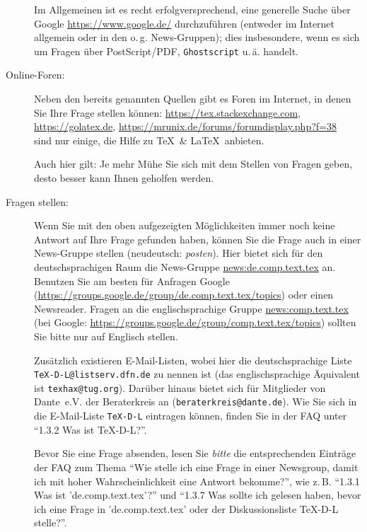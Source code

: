 \documentclass[12pt,ngerman,a4paper,fullparskip]{scrreprt}
\newcommand{\email}[1]{\texttt{#1}}
\newcommand{\cmdname}[1]{\texttt{#1}}
\newcommand{\dirname}[1]{\texttt{#1}}
\providecommand*{\PS}{Post\-Script\xspace}
\begin{document}
\begin{description}
      Im Allgemeinen ist es recht erfolgversprechend, eine generelle Suche über Google
      \url{https://www.google.de/} durchzuführen (entweder im Internet allgemein
      oder in den o.\,g. News-Gruppen); dies insbesondere, wenn es sich um Fragen über
      \PS/PDF, \cmdname{Ghostscript} u.\,ä. handelt.

\item [Online-Foren:] Neben den bereits genannten Quellen gibt es Foren im Internet, in denen Sie Ihre Frage stellen können: \url{https://tex.stackexchange.com}, \url{https://golatex.de}, \url{https://mrunix.de/forums/forumdisplay.php?f=38} \\ sind nur einige, die Hilfe zu \TeX\ \& \LaTeX\ anbieten.

Auch hier gilt: Je mehr Mühe Sie sich mit dem Stellen von Fragen geben, desto besser kann Ihnen geholfen werden.

\item [Fragen stellen:]
      Wenn Sie mit den oben aufgezeigten Möglichkeiten immer noch keine Antwort auf Ihre Frage gefunden haben, können Sie die Frage auch in einer News-Gruppe stellen (neudeutsch: \emph{posten}). Hier bietet sich für den deutschsprachigen Raum die News-Gruppe \url{news:de.comp.text.tex} an. 
      Benutzen Sie am besten für Anfragen Google 
      (\url{https://groups.google.de/group/de.comp.text.tex/topics})
      oder einen Newsreader. Fragen an die englischsprachige Gruppe
      \url{news:comp.text.tex} 
      (bei Google: \url{https://groups.google.de/group/comp.text.tex/topics}) 
      sollten Sie bitte nur auf Englisch stellen.

      Zusätzlich existieren E-Mail-Listen, wobei hier die deutschsprachige Liste
      \email{TeX-D-L@listserv.dfn.de} zu nennen ist (das englischsprachige Äquivalent 
      ist \email{texhax@tug.org}). Darüber hinaus bietet sich für Mitglieder
      von Dante~e.V. der Beraterkreis an (\email{beraterkreis@dante.de}).
      Wie Sie sich in die E-Mail-Liste \dirname{TeX-D-L} eintragen können,
      finden Sie in der FAQ unter \enquote{1.3.2 Was ist TeX-D-L?}.

      Bevor Sie eine Frage absenden, lesen Sie \emph{bitte} die entsprechenden
      Einträge der FAQ zum Thema \enquote{Wie stelle ich eine Frage in einer
      Newsgroup, damit ich mit hoher Wahrscheinlichkeit eine Antwort bekomme?}, wie 
      z.\,B. \enquote{1.3.1 Was ist 'de.comp.text.tex'?}  und \enquote{1.3.7 Was
      sollte ich gelesen haben, bevor ich eine Frage in 'de.comp.text.tex' oder der
      Diskussionsliste TeX-D-L stelle?}.


\end{description}
\end{document}
